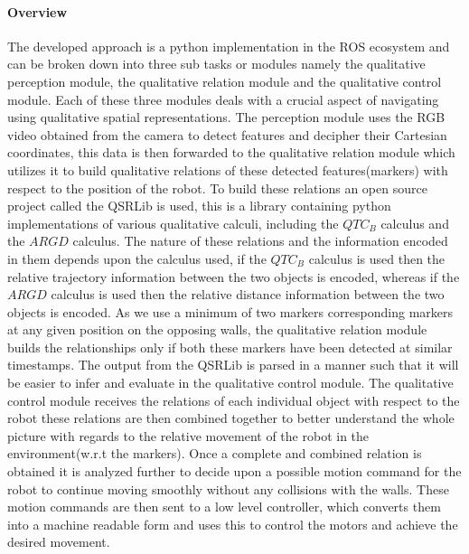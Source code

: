 \paragraph{Overview}The developed approach is a python implementation in the ROS ecosystem and can be broken down into three sub tasks or modules namely the qualitative perception module, the qualitative relation module and the qualitative control module. Each of these three modules deals with a crucial aspect of navigating using qualitative spatial representations. The perception module uses the RGB video obtained from the camera to detect features and decipher their Cartesian coordinates, this data is then forwarded to the qualitative relation module which utilizes it to build qualitative relations of these detected features(markers) with respect to the position of the robot. To build these relations an open source project called the QSRLib is used, this is a library containing python implementations of various qualitative calculi, including the $QTC_B$ calculus and the $ARGD$ calculus.  The nature of these relations and the information encoded in them depends upon the calculus used, if the $QTC_B$ calculus is used then the relative trajectory information between the two objects is encoded, whereas if the $ARGD$ calculus is used then the relative distance information between the two objects is encoded. As we use a minimum of two markers corresponding markers at any given position on the opposing walls, the qualitative relation module builds the relationships only if both these markers have been detected at similar timestamps. The output from the QSRLib is parsed in a manner such that it will be easier to infer and evaluate in the qualitative control module. The qualitative control module receives the relations of each individual object with respect to the robot these relations are then combined together to better understand the whole picture with regards to the relative movement of the robot in the environment(w.r.t the markers). Once a complete and combined relation is obtained it is analyzed further to decide upon a possible motion command for the robot to continue moving smoothly without any collisions with the walls. These motion commands are then sent to a low level controller, which converts them into a machine readable form and uses this to control the motors and achieve the desired movement.

